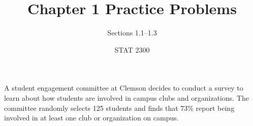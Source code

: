 \documentclass[noanswers]{exam}
\title{Chapter 1 Practice Problems}
\author{Sections 1.1--1.3}
\date{STAT 2300}
\begin{document}

\begin{questions} 

	\question A student engagement committee at Clemson decides to conduct a survey to learn about how students are involved in campus clubs and organizations. The committee randomly selects 125 students and finds that 73\% report being involved in at least one club or organization on campus.
	
	\vspace{5mm}

\end{questions}
\end{document}
